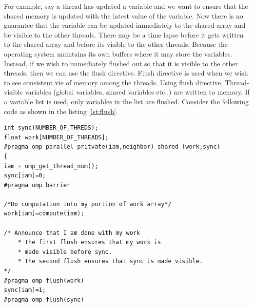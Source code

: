 \documentclass[12pt]{article}
\begin{document}
\begin{itemize}
    For example, say a thread has updated a variable and we want to ensure that the shared memory is updated with the latest value of the variable. Now there is no guarantee that the variable can be updated immediately to the shared array and be visible to the other threads. There may be a time lapse before it gets written to the shared array and before its visible to the other threads.
    Because the operating system maintains its own buffers where it may store the variables. Instead, if we wish to immediately flushed out so that it is visible to the other threads, then we can use the flush directive.
    Flush directive is used when we wish to see consistent vie of memory among the threads. Using flush directive, Thread-visible variables (global variables, shared variables etc..) are written to memory. If a variable list is used, only variables in the list are flushed.
    Consider the following code as shown in the listing \ref{lst:flush}.
\begin{lstlisting}[caption={Flush Directive},captionpos=b,label={lst:flush}]
int sync(NUMBER_OF_THREDS);
float work[NUMBER_OF_THREADS];
#pragma omp parallel pritvate(iam,neighbor) shared (work,sync)
{
iam = omp_get_thread_num();
sync[iam]=0;
#pragma omp barrier

/*Do computation into my portion of work array*/
work[iam]=compute(iam);

/* Announce that I am done with my work
    * The first flush ensures that my work is
    * made visible before sync.
    * The second flush ensures that sync is made visible.
*/
#pragma omp flush(work)
sync[iam]=1;
#pragma omp flush(sync)


\end{lstlisting}
\end{itemize}
\end{document}
